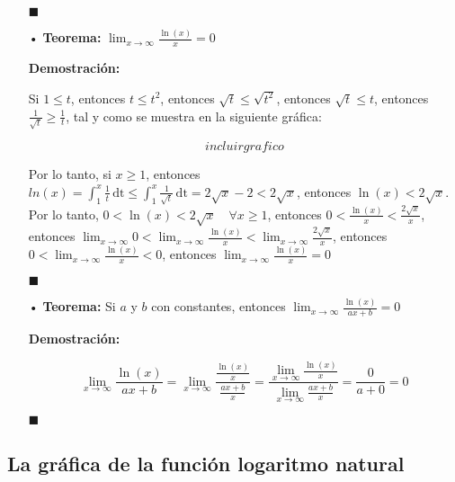 \documentclass[pts12]{article}
\numberwithin{equation}{section}
\newcommand{\Col}{\color{ProcessBlue}}
\newcommand{\xinteg}[4]{\int_{#1}^{#2} \! {#3} \, \mathrm{#4}}
\begin{document}
\begin{itemize}
\begin{flushright}
$\blacksquare$
\end{flushright}

\item[\Col •] \textbf{Teorema:} $\lim_{x\to\infty}\frac{\ln(x)}{x}=0$

\textbf{Demostración:} 

Si $1\leq t$, entonces $t\leq t^2$, entonces $\sqrt{t}\leq \sqrt{t^2}$, entonces $\sqrt{t}\leq t$, entonces $\frac{1}{\sqrt{t}}\geq\frac{1}{t}$, tal y como se muestra en la siguiente gráfica:

$$ incluirgrafico$$

Por lo tanto, si $x\geq 1$, entonces $ln(x)=\xinteg{1}{x}{\frac{1}{t}}{dt}\leq\xinteg{1}{x}{\frac{1}{\sqrt{t}}}{dt}=2\sqrt{x}-2<2\sqrt{x}$, entonces $\ln(x)<2\sqrt{x}$. Por lo tanto, $0<\ln(x)<2\sqrt{x} \quad \forall x\geq 1$, entonces $0<\frac{\ln(x)}{x}<\frac{2\sqrt{x}}{x}$, entonces $\lim_{x\to\infty}0<\lim_{x\to\infty}\frac{\ln(x)}{x}<\lim_{x\to\infty}\frac{2\sqrt{x}}{x}$, entonces $0<\lim_{x\to\infty}\frac{\ln(x)}{x}<0$, entonces $\lim_{x\to\infty}\frac{\ln(x)}{x}=0$

\begin{flushright}
$\blacksquare$
\end{flushright}

\item[\Col •] \textbf{Teorema:} Si $a$ y $b$ con constantes, entonces $\lim_{x\to\infty}\frac{\ln(x)}{ax+b}=0$

\textbf{Demostración:}

$$ \lim_{x\to\infty}\frac{\ln(x)}{ax+b}=\lim_{x\to\infty}\frac{\frac{\ln(x)}{x}}{\frac{ax+b}{x}}=\frac{\lim_{x\to\infty}\frac{\ln(x)}{x}}{\lim_{x\to\infty}\frac{ax+b}{x}}=\frac{0}{a+0}=0 $$

\begin{flushright}
$\blacksquare$
\end{flushright}

\end{itemize}

\subsection{\Col La gráfica de la función logaritmo natural}
\end{document}
